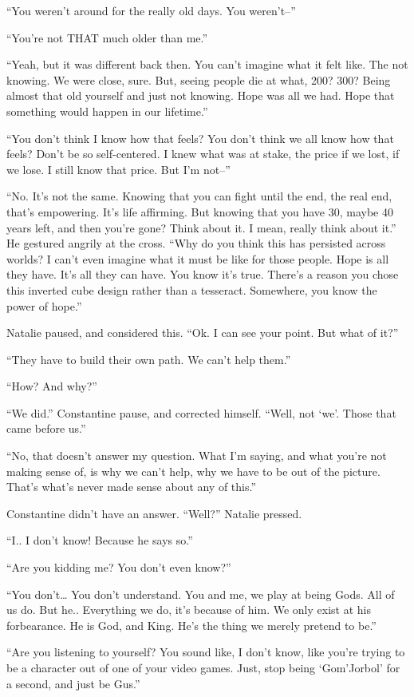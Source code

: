 “You weren’t around for the really old days. You weren’t–”

“You’re not THAT much older than me.”

“Yeah, but it was different back then. You can’t imagine what it felt like. The not knowing. We were close, sure. But, seeing people die at what, 200? 300? Being almost that old yourself and just not knowing. Hope was all we had. Hope that something would happen in our lifetime.”

“You don’t think I know how that feels? You don’t think we all know how that feels? Don’t be so self-centered. I knew what was at stake, the price if we lost, if we lose. I still know that price. But I’m not–”

“No. It’s not the same. Knowing that you can fight until the end, the real end, that’s empowering. It’s life affirming. But knowing that you have 30, maybe 40 years left, and then you’re gone? Think about it. I mean, really think about it.” He gestured angrily at the cross. “Why do you think this has persisted across worlds? I can’t even imagine what it must be like for those people. Hope is all they have. It’s all they can have. You know it’s true. There’s a reason you chose this inverted cube design rather than a tesseract. Somewhere, you know the power of hope.”

Natalie paused, and considered this. “Ok. I can see your point. But what of it?”

“They have to build their own path. We can’t help them.”

“How? And why?”

“We did.” Constantine pause, and corrected himself. “Well, not ‘we’. Those that came before us.”

“No, that doesn’t answer my question. What I’m saying, and what you’re not making sense of, is why we can’t help, why we have to be out of the picture. That’s what’s never made sense about any of this.”

Constantine didn’t have an answer. “Well?” Natalie pressed.

“I.. I don’t know! Because he says so.”

“Are you kidding me? You don’t even know?”

“You don’t… You don’t understand. You and me, we play at being Gods. All of us do. But he.. Everything we do, it’s because of him. We only exist at his forbearance. He is God, and King. He’s the thing we merely pretend to be.”

“Are you listening to yourself? You sound like, I don’t know, like you’re trying to be a character out of one of your video games. Just, stop being ‘Gom’Jorbol’ for a second, and just be Gus.”

